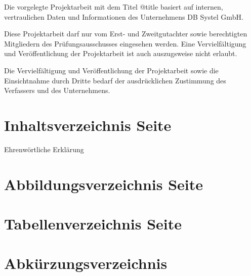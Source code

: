 Die vorgelegte Projektarbeit mit dem Titel @title basiert auf internen, vertraulichen Daten und Informationen des Unternehmens DB Systel GmbH.

Diese Projektarbeit darf nur vom Erst- und Zweitgutachter sowie berechtigten Mitgliedern des Prüfungsausschusses eingesehen werden.
Eine Vervielfältigung und Veröffentlichung der Projektarbeit ist auch auszugsweise nicht erlaubt.

Die Vervielfältigung und Veröffentlichung der Projektarbeit sowie die Einsichtnahme durch Dritte bedarf der ausdrücklichen
Zustimmung des Verfassers und des Unternehmens.
\newpage


\section*{Inhaltsverzeichnis \hfill Seite}
\pagestyle{sxoli1}
\renewcommand\contentsname{}
\tableofcontents
Ehrenwörtliche Erklärung
\newpage

\section*{Abbildungsverzeichnis \hfill Seite}
\renewcommand\listfigurename{}
\setlength{\cftfigindent}{0em}
\setlength{\cftfignumwidth}{6.5em}
\renewcommand{\cftfigpresnum}{Abbildung }
\listoffigures
\newpage

\section*{Tabellenverzeichnis \hfill Seite}
\renewcommand\listtablename{}
\setlength{\cfttabindent}{0em}
\setlength{\cfttabnumwidth}{5.5em}
\renewcommand{\cfttabpresnum}{Tabelle }
\listoftables
\newpage

\section*{Abkürzungsverzeichnis}
\begin{acronym}[*************]
 \end{acronym}
\newpage

